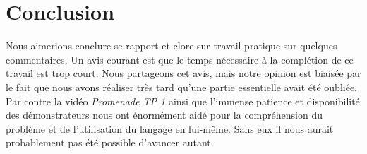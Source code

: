 \documentclass{article}
\begin{document}
\section{Conclusion}
Nous aimerions conclure se rapport et clore sur travail pratique sur quelques commentaires. Un avis courant est que le temps nécessaire à la complétion de ce travail est trop court. Nous partageons cet avis, mais notre opinion est biaisée par le fait que nous avons réaliser très tard qu'une partie essentielle avait été oubliée. Par contre la vidéo \textit{Promenade TP 1} ainsi que l'immense patience et disponibilité des démonstrateurs nous ont énormément aidé pour la compréhension du problème et de l'utilisation du langage en lui-même. Sans eux il nous aurait probablement pas été possible d'avancer autant.
\end{document}

